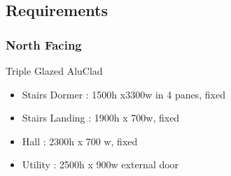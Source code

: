 \subsection{Requirements}
\subsubsection{North Facing}
Triple Glazed AluClad
\begin{itemize}
\item Stairs Dormer : 1500h x3300w in 4 panes, fixed
\item Stairs Landing : 1900h x 700w, fixed
\item Hall : 2300h x 700 w, fixed
\item Utility : 2500h x 900w external door
    
\end{itemize}
